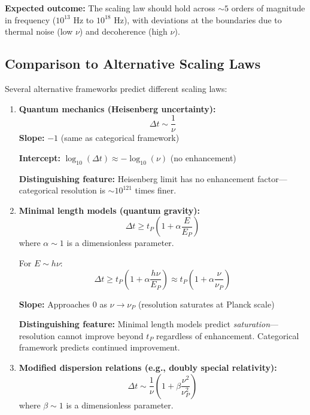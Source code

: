 \documentclass[twocolumn,10pt]{article}
\theoremstyle{remark}
\begin{document}
\textbf{Expected outcome:} The scaling law should hold across $\sim 5$ orders of magnitude in frequency ($10^{13}$ Hz to $10^{18}$ Hz), with deviations at the boundaries due to thermal noise (low $\nu$) and decoherence (high $\nu$).

\subsection{Comparison to Alternative Scaling Laws}

Several alternative frameworks predict different scaling laws:

\begin{enumerate}
    \item \textbf{Quantum mechanics (Heisenberg uncertainty):}
    \begin{equation}
        \Delta t \sim \frac{1}{\nu}
        \label{eq:heisenberg_scaling}
    \end{equation}
    \textbf{Slope:} $-1$ (same as categorical framework)
    
    \textbf{Intercept:} $\log_{10}(\Delta t) \approx -\log_{10}(\nu)$ (no enhancement)
    
    \textbf{Distinguishing feature:} Heisenberg limit has no enhancement factor—categorical resolution is $\sim 10^{121}$ times finer.
    
    \item \textbf{Minimal length models (quantum gravity):}
    \begin{equation}
        \Delta t \geq t_P \left(1 + \alpha \frac{E}{E_P}\right)
        \label{eq:minimal_length_scaling}
    \end{equation}
    where $\alpha \sim 1$ is a dimensionless parameter.
    
    For $E \sim h\nu$:
    \begin{equation}
        \Delta t \geq t_P \left(1 + \alpha \frac{h\nu}{E_P}\right) \approx t_P \left(1 + \alpha \frac{\nu}{\nu_P}\right)
        \label{eq:minimal_length_frequency}
    \end{equation}
    
    \textbf{Slope:} Approaches $0$ as $\nu \to \nu_P$ (resolution saturates at Planck scale)
    
    \textbf{Distinguishing feature:} Minimal length models predict \textit{saturation}—resolution cannot improve beyond $t_P$ regardless of enhancement. Categorical framework predicts continued improvement.
    
    \item \textbf{Modified dispersion relations (e.g., doubly special relativity):}
    \begin{equation}
        \Delta t \sim \frac{1}{\nu} \left(1 + \beta \frac{\nu^2}{\nu_P^2}\right)
        \label{eq:modified_dispersion}
    \end{equation}
    where $\beta \sim 1$ is a dimensionless parameter.
    

\end{enumerate}
\end{document}
